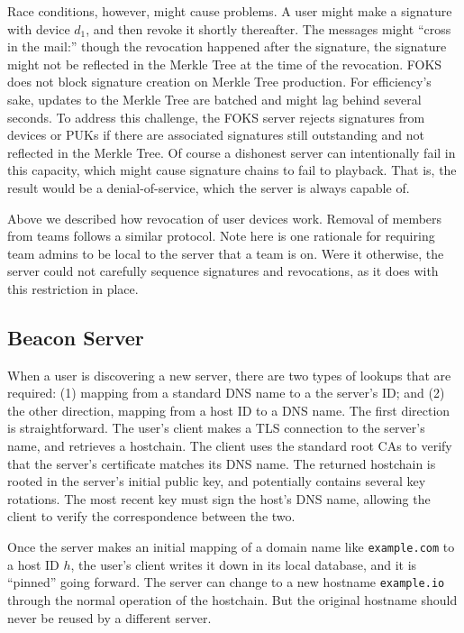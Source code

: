 Race conditions, however, might cause problems. A user might make a signature
with device $d_1$, and then revoke it shortly thereafter. The messages might
``cross in the mail:'' though the revocation happened after the signature, the
signature might not be reflected in the Merkle Tree at the time of the
revocation. FOKS does not block signature creation on Merkle Tree production.
For efficiency's sake, updates to the Merkle Tree are batched and might lag
behind several seconds. To address this challenge, the FOKS server
rejects signatures from devices or PUKs if there are associated signatures still
outstanding and not reflected in the Merkle Tree. Of course a dishonest server
can intentionally fail in this capacity, which might cause signature chains to
fail to playback. That is, the result would be a denial-of-service, which the
server is always capable of.

Above we described how revocation of user devices work. Removal of members from 
teams follows a similar protocol.  Note here is one rationale for requiring team
admins to be local to the server that a team is on. Were it otherwise, the
server could not carefully sequence signatures and revocations, as it does with
this restriction in place.

\subsection{Beacon Server}
\label{sec:beacon}

When a user is discovering a new server, there are two types of lookups that are
required: (1) mapping from a standard DNS name to a the server's ID; and (2) the
other direction, mapping from a host ID to a DNS name. The first direction is
straightforward.  The user's client makes a TLS connection to the server's name,
and retrieves a hostchain.  The client uses the standard root CAs to verify that
the server's certificate matches its DNS name. The returned hostchain is rooted
in the server's initial public key, and potentially contains several key
rotations. The most recent key must sign the host's DNS name, allowing the
client to verify the correspondence between the two. 

Once the server makes an initial mapping of a domain name like
\texttt{example.com} to a host ID $h$, the user's client writes it down in its
local database, and it is ``pinned'' going forward. The server can change to a
new hostname \texttt{example.io} through the normal operation of the
hostchain. But the original hostname should never be reused by a different
server.


